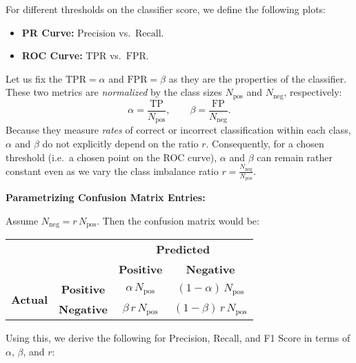 For different thresholds on the classifier score, we define the following plots:

\begin{itemize}
    \item \textbf{PR Curve:} \(\text{Precision}\) vs.\ \(\text{Recall}\).
    \item \textbf{ROC Curve:} \(\text{TPR}\) vs.\ \(\text{FPR}\).
\end{itemize}

\medskip


\bigskip
\solution
\small
Let us fix the \(\text{TPR} = \alpha\) and \(\text{FPR} = \beta\) as they are the properties of the classifier. These two metrics are \emph{normalized} by the class sizes \(N_{\text{pos}}\) and \(N_{\text{neg}}\), respectively:
\[
\alpha = \frac{\text{TP}}{N_{\text{pos}}}, 
\qquad
\beta = \frac{\text{FP}}{N_{\text{neg}}}.
\]
Because they measure \emph{rates} of correct or incorrect classification within each class, \(\alpha\) and \(\beta\) do not explicitly depend on the ratio \(r\). Consequently, for a chosen threshold (i.e.\ a chosen point on the ROC curve), \(\alpha\) and \(\beta\) can remain rather constant even as we vary the class imbalance ratio \(r = \frac{N_{\text{neg}}}{N_{\text{pos}}}\).

\bigskip
\noindent
\textbf{Parametrizing Confusion Matrix Entries:}

Assume \(N_{\text{neg}} = r\,N_{\text{pos}}\). Then the confusion matrix would be:

\begin{table}[!ht]
    \centering
    \renewcommand{\arraystretch}{1.2}
    \begin{tabular}{c|c|c|c|}
    \multicolumn{2}{c}{} & \multicolumn{2}{c}{\textbf{Predicted}} \\
    \cline{3-4}
    \multicolumn{2}{c|}{} 
       & \cellcolor{green!25}\textbf{Positive} 
       & \cellcolor{red!25}\textbf{Negative} \\
    \cline{2-4}
    \multirow{2}{*}{\textbf{Actual}} 
       & \cellcolor{green!25}\textbf{Positive} & \(\alpha \, N_{\text{pos}}\) & \((1-\alpha)\, N_{\text{pos}}\) \\ 
    \cline{2-4}
       & \cellcolor{red!25}\textbf{Negative} & \(\beta \,r\, N_{\text{pos}}\) & \((1-\beta)\,r\, N_{\text{pos}}\) \\ 
    \cline{2-4}
    \end{tabular}
\end{table}

\noindent
Using this, we derive the following for Precision, Recall, and F1 Score in terms of \(\alpha\), \(\beta\), and \(r\):

